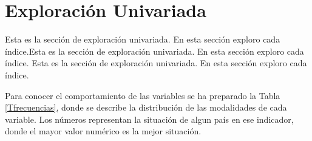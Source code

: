 \documentclass{article}
\begin{document}
\section{Exploración Univariada}\label{univariada}

Esta es la sección de exploración univariada. En esta sección exploro cada índice.Esta es la sección de exploración univariada. En esta sección exploro cada índice. Esta es la sección de exploración univariada. En esta sección exploro cada índice. 

Para conocer el comportamiento de las variables se ha preparado la Tabla \ref{Tfrecuencias}, donde se describe la distribución de las modalidades de cada variable. Los números representan la situación de algun país en ese indicador, donde el mayor valor numérico es la mejor situación.
\end{document}
